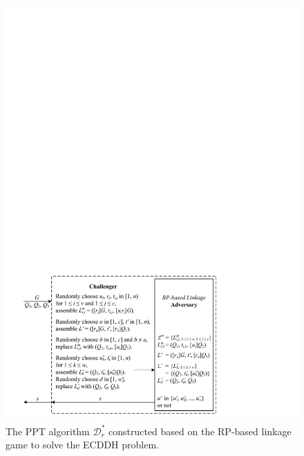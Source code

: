 \begin{figure}[tb]
  \centering
  \includegraphics[width=1.0\linewidth]{fig/rp-linkage-game.pdf}
  \caption{\newc The PPT algorithm $\mathcal{D}^*_r$ constructed based on the RP-based linkage game to solve the ECDDH problem.}
  \label{fig:dalgorithm}
\end{figure}


